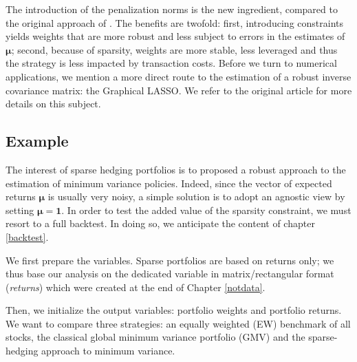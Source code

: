 \documentclass[]{krantz}
\theoremstyle{definition}
\theoremstyle{definition}
\theoremstyle{definition}
\theoremstyle{remark}
\begin{document}
The introduction of the penalization norms is the new ingredient,
compared to the original approach of \citet{stevens1998inverse}. The
benefits are twofold: first, introducing constraints yields weights that
are more robust and less subject to errors in the estimates of
\(\mathbf{\mu}\); second, because of sparsity, weights are more stable,
less leveraged and thus the strategy is less impacted by transaction
costs. Before we turn to numerical applications, we mention a more
direct route to the estimation of a robust inverse covariance matrix:
the Graphical LASSO. We refer to the original article
\citet{friedman2008sparse} for more details on this subject.

\hypertarget{sparseex}{%
\subsection{Example}\label{sparseex}}

The interest of sparse hedging portfolios is to proposed a robust
approach to the estimation of minimum variance policies. Indeed, since
the vector of expected returns \(\boldsymbol{\mu}\) is usually very
noisy, a simple solution is to adopt an agnostic view by setting
\(\boldsymbol{\mu}=\boldsymbol{1}\). In order to test the added value of
the sparsity constraint, we must resort to a full backtest. In doing so,
we anticipate the content of chapter \ref{backtest}.

We first prepare the variables. Sparse portfolios are based on returns
only; we thus base our analysis on the dedicated variable in
matrix/rectangular format (\emph{returns}) which were created at the end
of Chapter \ref{notdata}.

Then, we initialize the output variables: portfolio weights and
portfolio returns. We want to compare three strategies: an equally
weighted (EW) benchmark of all stocks, the classical global minimum
variance portfolio (GMV) and the sparse-hedging approach to minimum
variance.

\footnotesize
\end{document}
